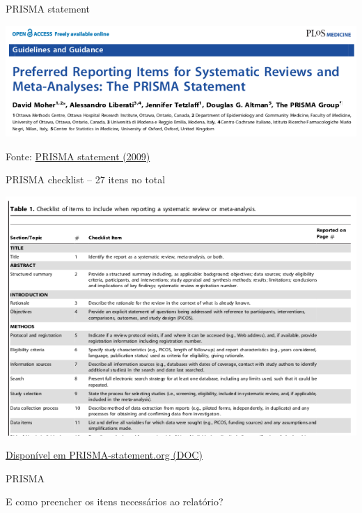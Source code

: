 \documentclass{beamer}
\begin{document}
\begin{frame}{PRISMA statement}
  \begin{center}
    \includegraphics[width=\textwidth]{Revisao_resumo/PRISMA-statement}
  \end{center}

  \vfill
  \scriptsize
  \hfill Fonte: \href{https://doi.org/10.1371/journal.pmed.1000097}
  {\tiny PRISMA statement (2009)}
\end{frame}

\begin{frame}{PRISMA checklist -- 27 itens no total}
  \begin{center}
    \includegraphics[height=.8\textheight]{Revisao_resumo/PRISMA-checklist}
  \end{center}

  \vfill
  \scriptsize
  \hfill \href{http://www.prisma-statement.org/}
  {\tiny Disponível em PRISMA-statement.org (DOC)}
\end{frame}

\begin{frame}{PRISMA}
  \begin{center}
    E como preencher os itens necessários ao relatório?
  \end{center}
\end{frame}
\end{document}
